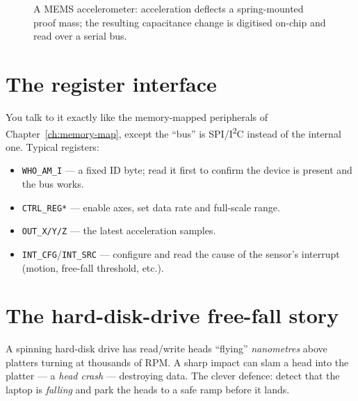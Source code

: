 \documentclass[11pt,a4paper,oneside]{book}
\newcommand{\code}[1]{\texttt{#1}}
\begin{document}
\begin{figure}[h]
\centering
{}
\caption{A MEMS accelerometer: acceleration deflects a spring-mounted proof mass;
the resulting capacitance change is digitised on-chip and read over a serial bus.}
\label{fig:mems}
\end{figure}

\section{The register interface}
You talk to it exactly like the memory-mapped peripherals of
Chapter~\ref{ch:memory-map}, except the ``bus'' is SPI/I\textsuperscript{2}C
instead of the internal one. Typical registers:
\begin{itemize}[leftmargin=1.4cm]
  \item \code{WHO\_AM\_I} --- a fixed ID byte; read it first to confirm the
        device is present and the bus works.
  \item \code{CTRL\_REG*} --- enable axes, set data rate and full-scale range.
  \item \code{OUT\_X/Y/Z} --- the latest acceleration samples.
  \item \code{INT\_CFG}/\code{INT\_SRC} --- configure and read the cause of the
        sensor's interrupt (motion, free-fall threshold, etc.).
\end{itemize}

\section{The hard-disk-drive free-fall story}
A spinning hard-disk drive has read/write heads ``flying'' \emph{nanometres}
above platters turning at thousands of RPM. A sharp impact can slam a head into
the platter --- a \emph{head crash} --- destroying data. The clever defence:
detect that the laptop is \emph{falling} and park the heads to a safe ramp before
it lands.
\end{document}
